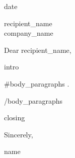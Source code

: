\documentclass[11pt]{article}
\begin{document}
\begin{flushright}
{{date}}
\end{flushright}

\vspace{12pt}

{{recipient_name}}\\
{{company_name}}

\vspace{12pt}

Dear {{recipient_name}},

{{intro}}

{{#body_paragraphs}}
{{.}}

{{/body_paragraphs}}

{{closing}}

\vspace{12pt}

Sincerely,

\vspace{24pt}

{{name}}
\end{document}
